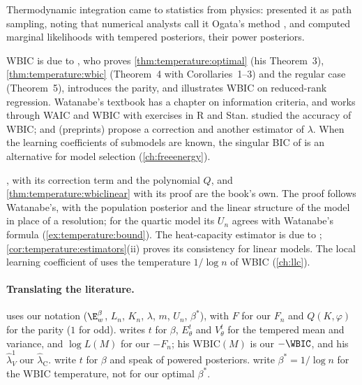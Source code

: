 \begin{refsection}
\notesandrefs

Thermodynamic integration came to statistics from physics: \textcite{GelmanMeng1998} presented it as path sampling, noting that numerical analysts call it Ogata's method \parencite{Ogata1989}, and \textcite{FrielPettitt2008} computed marginal likelihoods with tempered posteriors, their power posteriors.

WBIC is due to \textcite{Watanabe2013}, who proves \cref{thm:temperature:optimal} (his Theorem~3), \cref{thm:temperature:wbic} (Theorem~4 with Corollaries~1--3) and the regular case (Theorem~5), introduces the parity, and illustrates WBIC on reduced-rank regression. Watanabe's textbook \parencite{Watanabe2018} has a chapter on information criteria, and \textcite{Suzuki2023a} works through WAIC and WBIC with exercises in R and Stan. \Textcite{FrielEtAl2017} studied the accuracy of WBIC; \textcite{Imai2019b} and \textcite{TakioSuzuki2025} (preprints) propose a correction and another estimator of $\lambda$. When the learning coefficients of submodels are known, the singular BIC of \textcite{DrtonPlummer2017} is an alternative for model selection (\cref{ch:freeenergy}).

, with its correction term and the polynomial $Q$, and \cref{thm:temperature:wbiclinear} with its proof are the book's own. The proof follows Watanabe's, with the population posterior and the linear structure of the model in place of a resolution; for the quartic model its $U_n$ agrees with Watanabe's formula (\cref{ex:temperature:bound}). The heat-capacity estimator is due to \textcite{Imai2019a}; \cref{cor:temperature:estimators}(ii) proves its consistency for linear models. The local learning coefficient of \textcite{LauEtAl2025} uses the temperature $1/\log n$ of WBIC (\cref{ch:llc}).

\paragraph{Translating the literature.} \Textcite{Watanabe2013} uses our notation ($\E^\beta_w$, $L_n$, $K_n$, $\lambda$, $m$, $U_n$, $\beta^*$), with $F$ for our $F_n$ and $Q(K,\varphi)$ for the parity ($1$ for odd). \Textcite{Imai2019a} writes $t$ for $\beta$, $E^t_\theta$ and $V^t_\theta$ for the tempered mean and variance, and $\log L(M)$ for our $-F_n$; his $\mathrm{WBIC}(M)$ is our $-\WBIC$, and his $\hat\lambda^1_V$ our $\hat\lambda_{\mathrm C}$. \Textcite{FrielEtAl2017} write $t$ for $\beta$ and speak of powered posteriors. \Textcite{LauEtAl2025} write $\beta^*=1/\log n$ for the WBIC temperature, not for our optimal $\beta^*$.

\printchapterbib
\end{refsection}
